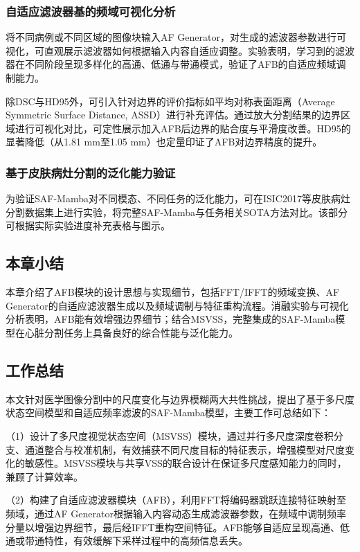 \documentclass[12pt, a4paper, twoside]{article}
\begin{document}
\subsubsection{自适应滤波器基的频域可视化分析}

将不同病例或不同区域的图像块输入AF Generator，对生成的滤波器参数进行可视化，可直观展示滤波器如何根据输入内容自适应调整。实验表明，学习到的滤波器在不同阶段呈现多样化的高通、低通与带通模式，验证了AFB的自适应频域调制能力。


除DSC与HD95外，可引入针对边界的评价指标如平均对称表面距离（Average Symmetric Surface Distance, ASSD）进行补充评估。通过放大分割结果的边界区域进行可视化对比，可定性展示加入AFB后边界的贴合度与平滑度改善。HD95的显著降低（从1.81 mm至1.05 mm）也定量印证了AFB对边界精度的提升。

\subsubsection{基于皮肤病灶分割的泛化能力验证}

为验证SAF-Mamba对不同模态、不同任务的泛化能力，可在ISIC2017等皮肤病灶分割数据集上进行实验，将完整SAF-Mamba与任务相关SOTA方法对比。该部分可根据实际实验进度补充表格与图示。

\subsection{本章小结}

本章介绍了AFB模块的设计思想与实现细节，包括FFT/IFFT的频域变换、AF Generator的自适应滤波器生成以及频域调制与特征重构流程。消融实验与可视化分析表明，AFB能有效增强边界细节；结合MSVSS，完整集成的SAF-Mamba模型在心脏分割任务上具备良好的综合性能与泛化能力。


\subsection{工作总结}

本文针对医学图像分割中的尺度变化与边界模糊两大共性挑战，提出了基于多尺度状态空间模型和自适应频率滤波的SAF-Mamba模型，主要工作可总结如下：

（1）设计了多尺度视觉状态空间（MSVSS）模块，通过并行多尺度深度卷积分支、通道整合与校准机制，有效捕获不同尺度目标的特征表示，增强模型对尺度变化的敏感性。MSVSS模块与共享VSS的联合设计在保证多尺度感知能力的同时，兼顾了计算效率。

（2）构建了自适应滤波器模块（AFB），利用FFT将编码器跳跃连接特征映射至频域，通过AF Generator根据输入内容动态生成滤波器参数，在频域中调制频率分量以增强边界细节，最后经IFFT重构空间特征。AFB能够自适应呈现高通、低通或带通特性，有效缓解下采样过程中的高频信息丢失。
\end{document}
